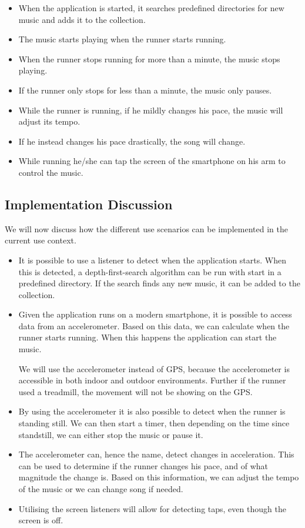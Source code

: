 \begin{itemize}
	\item When the application is started, it searches predefined directories for new music and adds it to the collection.
	\item The music starts playing when the runner starts running.
	\item When the runner stops running for more than a minute, the music stops playing.
	\item If the runner only stops for less than a minute, the music only pauses.
	\item While the runner is running, if he mildly changes his pace, the music will adjust its tempo.
	\item If he instead changes his pace drastically, the song will change.
	\item While running he/she can tap the screen of the smartphone on his arm to control the music.
\end{itemize}

\subsection{Implementation Discussion}
We will now discuss how the different use scenarios can be implemented in the current use context.
\begin{itemize}
	\item It is possible to use a listener to detect when the application starts. When this is detected, a depth-first-search algorithm can be run with start in a predefined directory. If the search finds any new music, it can be added to the collection.
	
	\item Given the application runs on a modern smartphone, it is possible to access data from an accelerometer. Based on this data, we can calculate when the runner starts running. When this happens the application can start the music.
	
	We will use the accelerometer instead of GPS, because the accelerometer is accessible in both indoor and outdoor environments. Further if the runner used a treadmill, the movement will not be showing on the GPS.
	
	\item By using the accelerometer it is also possible to detect when the runner is standing still. We can then start a timer, then depending on the time since standstill, we can either stop the music or pause it.
	
	\item The accelerometer can, hence the name, detect changes in acceleration.
	This can be used to determine if the runner changes his pace, and of what magnitude the change is.
	Based on this information, we can adjust the tempo of the music or we can change song if needed.
	
	\item Utilising the screen listeners will allow for detecting taps, even though the screen is off.	
\end{itemize}

